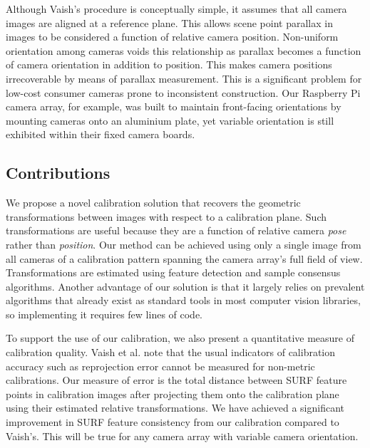 \documentclass{article} \usepackage{acra}
\begin{document}

Although Vaish's procedure is conceptually simple, it assumes that all camera
images are aligned at a reference plane. This allows scene point parallax in
images to be considered a function of relative camera position. Non-uniform
orientation among cameras voids this relationship as parallax becomes a function
of camera orientation in addition to position. This makes camera positions
irrecoverable by means of parallax measurement. This is a significant problem
for low-cost consumer cameras prone to inconsistent construction. Our Raspberry
Pi camera array, for example, was built to maintain front-facing orientations by
mounting cameras onto an aluminium plate, yet variable orientation is still
exhibited within their fixed camera boards.

\subsection{Contributions}


We propose a novel calibration solution that recovers the geometric
transformations between images with respect to a calibration plane. Such
transformations are useful because they are a function of relative camera
\emph{pose} rather than \emph{position}. Our method can be achieved using only a
single image from all cameras of a calibration pattern spanning the camera
array's full field of view. Transformations are estimated using feature
detection and sample consensus algorithms. Another advantage of our solution is
that it largely relies on prevalent algorithms that already exist as standard
tools in most computer vision libraries, so implementing it requires few lines
of code.


To support the use of our calibration, we also present a quantitative measure of
calibration quality. Vaish et al.  note that the
usual indicators of calibration accuracy such as reprojection error cannot be
measured for non-metric calibrations. Our measure of error is the total distance
between SURF feature points in calibration images after projecting them onto the
calibration plane using their estimated relative transformations. We have
achieved a significant improvement in SURF feature consistency from our
calibration compared to Vaish's. This will be true for any camera array with
variable camera orientation.
\end{document}
